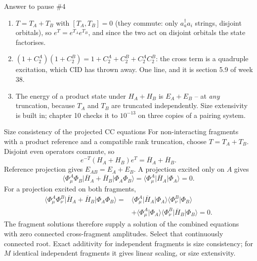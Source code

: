 \documentclass[aspectratio=169,10pt]{beamer}
\newcounter{thinkctr}
\newcommand{\thinka}[1]{%
  \vfill
  \begin{tcolorbox}[enhanced,colback=paleteal,colframe=teal,boxrule=1.2pt,arc=4pt,
    grow to left by=6mm,grow to right by=6mm,
    left=16pt,right=16pt,top=16pt,bottom=18pt,
    fonttitle=\bfseries\Large,fontupper=\large,
    title={Answer to pause \#\thethinkctr}]
  #1
  \end{tcolorbox}
  \vfill}
\newcommand{\braket}[2]{\langle #1\vert #2\rangle}
\newcommand{\mel}[3]{\langle #1\lvert #2\rvert #3\rangle}
\newcommand{\cre}[1]{a_{#1}^{\dagger}}
\newcommand{\ann}[1]{a_{#1}}
\newcommand{\Hbar}{\overline{H}}
\begin{document}
\begin{frame}{Answer to pause \#4}
\thinka{%
\begin{enumerate}
\item $T=T_A+T_B$ with $[T_A,T_B]=0$ (they commute: only $\cre{a}\ann{i}$ strings, disjoint orbitals), so $e^{T}=e^{T_A}e^{T_B}$, and since the two act on disjoint orbitals the state factorises.
\item $(1+C_2^A)(1+C_2^B)=1+C_2^A+C_2^B+C_2^AC_2^B$: the cross term is a quadruple excitation, which CID has thrown away. One line, and it is section 5.9 of week 38.
\item The energy of a product state under $H_A+H_B$ is $E_A+E_B$ -- at \emph{any} truncation, because $T_A$ and $T_B$ are truncated independently. Size extensivity is built in; chapter 10 checks it to $10^{-13}$ on three copies of a pairing system.
\end{enumerate}}
\end{frame}

\begin{frame}{Size consistency of the projected CC equations}
For non-interacting fragments with a product reference and a compatible rank truncation, choose $T=T_A+T_B$. Disjoint even operators commute, so
\[
 e^{-T}(H_A+H_B)e^T=\Hbar_A+\Hbar_B.
\]
Reference projection gives $E_{AB}=E_A+E_B$. A projection excited only on $A$ gives
\[
 \mel{\Phi_\mu^A\Phi_B}{\Hbar_A+\Hbar_B}{\Phi_A\Phi_B}
 =\mel{\Phi_\mu^A}{\Hbar_A}{\Phi_A}=0.
\]
For a projection excited on both fragments,
\begin{align*}
\mel{\Phi_\mu^A\Phi_\nu^B}{\Hbar_A+\Hbar_B}{\Phi_A\Phi_B}
={}&\mel{\Phi_\mu^A}{\Hbar_A}{\Phi_A}\braket{\Phi_\nu^B}{\Phi_B}\\
&+\braket{\Phi_\mu^A}{\Phi_A}\mel{\Phi_\nu^B}{\Hbar_B}{\Phi_B}=0.
\end{align*}
The fragment solutions therefore supply a solution of the combined equations with zero connected cross-fragment amplitudes. Select that continuously connected root. Exact additivity for independent fragments is size consistency; for $M$ identical independent fragments it gives linear scaling, or size extensivity.
\end{frame}
\end{document}
